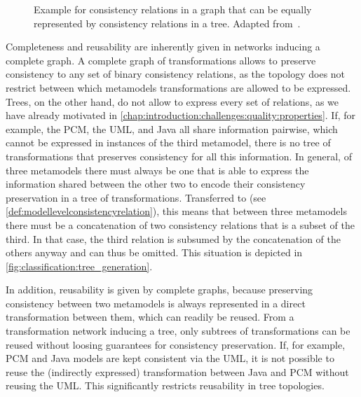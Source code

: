 \begin{figure}
    \centering
    
    \caption[Equality of graph and tree of consistency relations]{Example for consistency relations in a graph that can be equally represented by consistency relations in a tree. Adapted from~.}
    \label{fig:classification:tree_generation}
\end{figure}

Completeness and reusability are inherently given in networks inducing a complete graph.
A complete graph of transformations allows to preserve consistency to any set of binary consistency relations, as the topology does not restrict between which metamodels transformations are allowed to be expressed.
Trees, on the other hand, do not allow to express every set of relations, as we have already motivated in \autoref{chap:introduction:challenges:quality:properties}.
If, for example, the \gls{PCM}, the \gls{UML}, and Java all share information pairwise, which cannot be expressed in instances of the third metamodel, there is no tree of transformations that preserves consistency for all this information.
In general, of three metamodels there must always be one that is able to express the information shared between the other two to encode their consistency preservation in a tree of transformations.
Transferred to \modellevelconsistencyrelations (see \autoref{def:modellevelconsistencyrelation}), this means that between three metamodels there must be a concatenation of two consistency relations that is a subset of the third.
In that case, the third relation is subsumed by the concatenation of the others anyway and can thus be omitted.
This situation is depicted in \autoref{fig:classification:tree_generation}.

In addition, reusability is given by complete graphs, because preserving consistency between two metamodels is always represented in a direct transformation between them, which can readily be reused.
From a transformation network inducing a tree, only subtrees of transformations can be reused without loosing guarantees for consistency preservation.
If, for example, \gls{PCM} and Java models are kept consistent via the \gls{UML}, it is not possible to reuse the (indirectly expressed) transformation between Java and \gls{PCM} without reusing the \gls{UML}.
This significantly restricts reusability in tree topologies.

